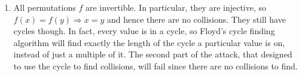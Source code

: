\begin{enumerate}
\item All permutations $f$ are invertible. In particular,  they are injective, so
$f(x)=f(y) \Rightarrow x=y$ and hence there are no collisions. They still have
cycles though. In fact, every value is in a cycle, so Floyd's cycle finding algorithm
will find exactly the length of the cycle a particular value is on, instead of
just a multiple of it. The second part of the attack, that designed to use the
cycle to find collisions, will fail since there are no collisions to find.

\end{enumerate}
